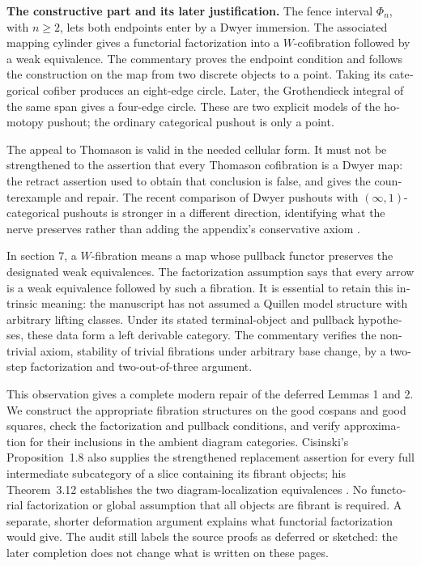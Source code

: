 \begin{otherlanguage}{english}
\medskip\noindent\textbf{The constructive part and its later justification.}
The fence interval $\Phi_n$, with $n\geq2$, lets both endpoints enter by a Dwyer immersion. The associated mapping cylinder gives a functorial factorization into a $W$-cofibration followed by a weak equivalence. The commentary proves the endpoint condition and follows the construction on the map from two discrete objects to a point. Taking its categorical cofiber produces an eight-edge circle. Later, the Grothendieck integral of the same span gives a four-edge circle. These are two explicit models of the homotopy pushout; the ordinary categorical pushout is only a point.

The appeal to Thomason is valid in the needed cellular form. It must not be strengthened to the assertion that every Thomason cofibration is a Dwyer map: the retract assertion used to obtain that conclusion is false, and \citet{Cisinski1999Dwyer} gives the counterexample and repair. The recent comparison of Dwyer pushouts with $(\infty,1)$-categorical pushouts is stronger in a different direction, identifying what the nerve preserves rather than adding the appendix's conservative axiom \citep[Theorems~1.5--1.6, arXiv v3]{HackneyOzornovaRiehlRovelli2024}.

In section 7, a $W$-fibration means a map whose pullback functor preserves the designated weak equivalences. The factorization assumption says that every arrow is a weak equivalence followed by such a fibration. It is essential to retain this intrinsic meaning: the manuscript has not assumed a Quillen model structure with arbitrary lifting classes. Under its stated terminal-object and pullback hypotheses, these data form a left derivable category. The commentary verifies the nontrivial axiom, stability of trivial fibrations under arbitrary base change, by a two-step factorization and two-out-of-three argument.

This observation gives a complete modern repair of the deferred Lemmas 1 and 2. We construct the appropriate fibration structures on the good cospans and good squares, check the factorization and pullback conditions, and verify approximation for their inclusions in the ambient diagram categories. Cisinski's Proposition~1.8 also supplies the strengthened replacement assertion for every full intermediate subcategory of a slice containing its fibrant objects; his Theorem~3.12 establishes the two diagram-localization equivalences \citep{Cisinski2010}. No functorial factorization or global assumption that all objects are fibrant is required. A separate, shorter deformation argument explains what functorial factorization would give. The audit still labels the source proofs as deferred or sketched: the later completion does not change what is written on these pages.


\end{otherlanguage}

